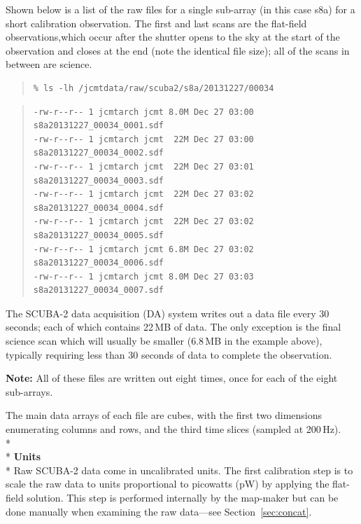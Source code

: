 \documentclass[twoside,11pt]{article}
\newcommand{\htmlref}[2]{#1}
\newcommand{\latexhtml}[2]{#1}
\renewcommand{\_}{\texttt{\symbol{95}}}
\newenvironment{myquote}{
   \color{MidnightBlue}\begin{quote}\begin{small}}{
   \end{small}\end{quote}
}
\newcommand{\cref}[3]{\latexhtml{#1~\ref{#2}}{\htmlref{#3}{#2}}}
\renewenvironment{myquote}{
      \begin{quote}\begin{small}}{
      \end{small}\end{quote}
   }
\begin{document}
Shown below is a list of the raw files for a single sub-array (in this
case s8a) for a short calibration observation. The first and last scans
are the flat-field observations,which occur after the shutter opens to
the sky at the start of the observation and closes at the end (note the
identical file size); all of the scans in between are science.


\begin{myquote}
\begin{verbatim}
% ls -lh /jcmtdata/raw/scuba2/s8a/20131227/00034
\end{verbatim}
\end{myquote}
\vspace{-1cm}
\begin{quote}
\begin{verbatim}
-rw-r--r-- 1 jcmtarch jcmt 8.0M Dec 27 03:00 s8a20131227_00034_0001.sdf
-rw-r--r-- 1 jcmtarch jcmt  22M Dec 27 03:00 s8a20131227_00034_0002.sdf
-rw-r--r-- 1 jcmtarch jcmt  22M Dec 27 03:01 s8a20131227_00034_0003.sdf
-rw-r--r-- 1 jcmtarch jcmt  22M Dec 27 03:02 s8a20131227_00034_0004.sdf
-rw-r--r-- 1 jcmtarch jcmt  22M Dec 27 03:02 s8a20131227_00034_0005.sdf
-rw-r--r-- 1 jcmtarch jcmt 6.8M Dec 27 03:02 s8a20131227_00034_0006.sdf
-rw-r--r-- 1 jcmtarch jcmt 8.0M Dec 27 03:03 s8a20131227_00034_0007.sdf
\end{verbatim}
\end{quote}
The SCUBA-2 data
acquisition (DA) system writes out a data file every 30 seconds; each
of which contains 22\,MB of data. The only exception is the final science
scan which will usually be smaller (6.8\,MB in the example above), typically
requiring less than 30 seconds of data to complete the observation.

\textbf{Note:} All of these files are written out eight times, once for each of
the eight sub-arrays.

The main data arrays of each file are cubes, with the first two
dimensions enumerating columns and rows, and the third time slices
(sampled at 200\,Hz).
\\*\\*
\textbf{Units}\\*
Raw SCUBA-2 data come in uncalibrated units. The first calibration
step is to scale the raw data to units proportional to picowatts (pW)
by applying the flat-field solution. This step is performed internally
 by the map-maker but can be done manually when examining the raw data---see
\cref{Section}{sec:concat}{Concatenate \& apply a flat-field}.
\end{document}
